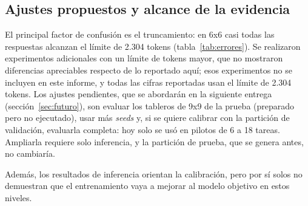 \subsection{Ajustes propuestos y alcance de la evidencia}
\label{sec:ajustes}
El principal factor de confusión es el truncamiento: en 6x6 casi todas las
respuestas alcanzan el límite de 2.304 tokens (tabla~\ref{tab:errores}). Se
realizaron experimentos adicionales con un límite de tokens mayor, que no
mostraron diferencias apreciables respecto de lo reportado aquí; esos
experimentos no se incluyen en este informe, y todas las cifras reportadas usan
el límite de 2.304 tokens. Los ajustes pendientes, que se abordarán en la
siguiente entrega (sección~\ref{sec:futuro}), son evaluar los tableros de 9x9 de
la prueba (preparado pero no ejecutado), usar más \emph{seeds} y, si se quiere
calibrar con la partición de validación, evaluarla completa: hoy solo se usó en
pilotos de 6 a 18 tareas. Ampliarla requiere solo inferencia, y la partición de
prueba, que se genera antes, no cambiaría.

Además, los resultados de inferencia orientan la calibración, pero por sí solos
no demuestran que el entrenamiento vaya a mejorar al modelo objetivo en estos
niveles.
